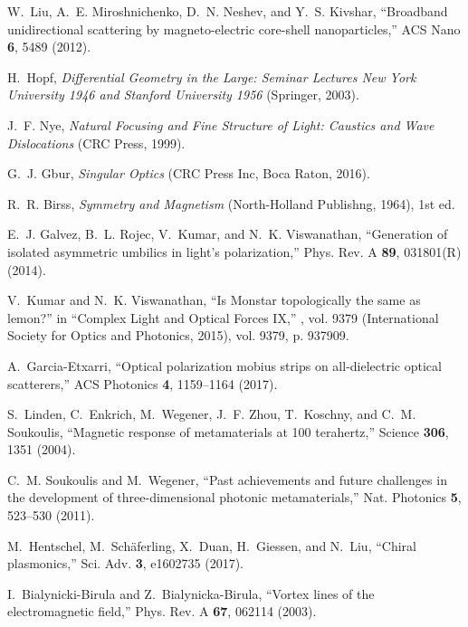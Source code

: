 \documentclass[aps,twocolumn,superscriptaddress]{revtex4-1}
\begin{document}
\begin{thebibliography}{10}
W.~Liu, A.~E. Miroshnichenko, D.~N. Neshev, and Y.~S. Kivshar,
  \enquote{Broadband unidirectional scattering by magneto-electric core-shell
  nanoparticles,} ACS Nano \textbf{6}, 5489 (2012).

H.~Hopf, \emph{Differential {{Geometry}} in the {{Large}}: {{Seminar Lectures
  New York University}} 1946 and {{Stanford University}} 1956} ({Springer},
  2003).

J.~F. Nye, \emph{Natural {{Focusing}} and {{Fine Structure}} of {{Light}}:
  {{Caustics}} and {{Wave Dislocations}}} ({CRC Press}, 1999).

G.~J. Gbur, \emph{Singular {{Optics}}} ({CRC Press Inc}, Boca Raton, 2016).

R.~R. Birss, \emph{Symmetry and {{Magnetism}}} ({North-Holland Publishng},
  1964), 1st ed.

E.~J. Galvez, B.~L. Rojec, V.~Kumar, and N.~K. Viswanathan, \enquote{Generation
  of isolated asymmetric umbilics in light's polarization,} Phys. Rev. A
  \textbf{89}, 031801(R) (2014).

V.~Kumar and N.~K. Viswanathan, \enquote{Is {{Monstar}} topologically the same
  as lemon?} in \enquote{Complex {{Light}} and {{Optical Forces IX}},} , vol.
  9379 ({International Society for Optics and Photonics}, 2015), vol. 9379, p.
  937909.

A.~{Garcia-Etxarri}, \enquote{Optical polarization mobius strips on
  all-dielectric optical scatterers,} ACS Photonics \textbf{4}, 1159--1164
  (2017).

S.~Linden, C.~Enkrich, M.~Wegener, J.~F. Zhou, T.~Koschny, and C.~M. Soukoulis,
  \enquote{Magnetic response of metamaterials at 100 terahertz,} Science
  \textbf{306}, 1351 (2004).

C.~M. Soukoulis and M.~Wegener, \enquote{Past achievements and future
  challenges in the development of three-dimensional photonic metamaterials,}
  Nat. Photonics \textbf{5}, 523--530 (2011).

M.~Hentschel, M.~Sch{\"a}ferling, X.~Duan, H.~Giessen, and N.~Liu,
  \enquote{Chiral plasmonics,} Sci. Adv. \textbf{3}, e1602735 (2017).

I.~{Bialynicki-Birula} and Z.~{Bialynicka-Birula}, \enquote{Vortex lines of the
  electromagnetic field,} Phys. Rev. A \textbf{67}, 062114 (2003).


\end{thebibliography}
\end{document}

